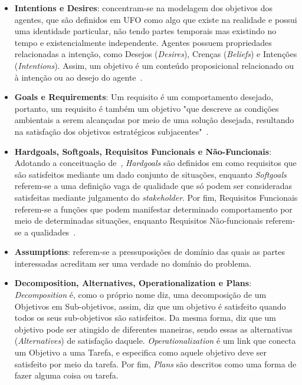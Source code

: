 \begin{itemize}
	\item \textbf{Intentions e Desires}: concentram-se na modelagem dos objetivos dos agentes, que são definidos em UFO como algo que existe na realidade e possui uma identidade particular, não tendo partes temporais mas existindo no tempo e existencialmente independente. Agentes possuem propriedades relacionadas a intenção, como Desejos (\textit{Desires}), Crenças (\textit{Beliefs}) e Intenções (\textit{Intentions}). Assim, um objetivo é um conteúdo proposicional relacionado ou à intenção ou ao desejo do agente~\cite{pedrogoro}.
	\item \textbf{Goals e Requirements}: Um requisito é um comportamento desejado, portanto, um requisito é também um objetivo "que descreve as condições ambientais a serem alcançadas por meio de uma solução desejada, resultando na satisfação dos objetivos estratégicos subjacentes"~\cite{pedrogoro}.
	\item \textbf{Hardgoals, Softgoals, Requisitos Funcionais e Não-Funcionais}: Adotando a conceituação de~\cite{guizzardi2014ontological}, \textit{Hardgoals} são definidos em \goro como requisitos que são satisfeitos mediante um dado conjunto de situações, enquanto \textit{Softgoals} referem-se a uma definição vaga de qualidade que só podem ser consideradas satisfeitas mediante julgamento do \textit{stakeholder}. Por fim, Requisitos Funcionais referem-se a funções que podem manifestar determinado comportamento por meio de determinadas situações, enquanto Requisitos Não-funcionais referem-se a qualidades~\cite{pedrogoro}.
	\item \textbf{Assumptions}: referem-se a pressuposições de domínio das quais as partes interessadas acreditam ser uma verdade no domínio do problema.
	\item \textbf{Decomposition, Alternatives, Operationalization e Plans}: \textit{Decomposition} é, como o próprio nome diz, uma decomposição de um Objetivos em Sub-objetivos, assim, diz que um objetivo é satisfeito quando todos os seus sub-objetivos são satisfeitos. Da mesma forma, diz que um objetivo pode ser atingido de diferentes maneiras, sendo essas as alternativas (\textit{Alternatives}) de satisfação daquele. \textit{Operationalization} é um link que conecta um Objetivo a uma Tarefa, e especifica como aquele objetivo deve ser satisfeito por meio da tarefa. Por fim, \textit{Plans} são descritos como uma forma de fazer alguma coisa ou tarefa.	
\end{itemize}

